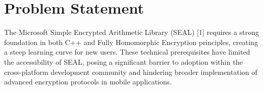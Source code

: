 \section{Problem Statement}
The Microsoft Simple Encrypted Arithmetic Library (SEAL) [1] requires a strong foundation in both C++ and Fully Homomorphic Encryption principles, creating a steep learning curve for new users. These technical prerequisites have limited the accessibility of SEAL, posing a significant barrier to adoption within the cross-platform development community and hindering broader implementation of advanced encryption protocols in mobile applications.
